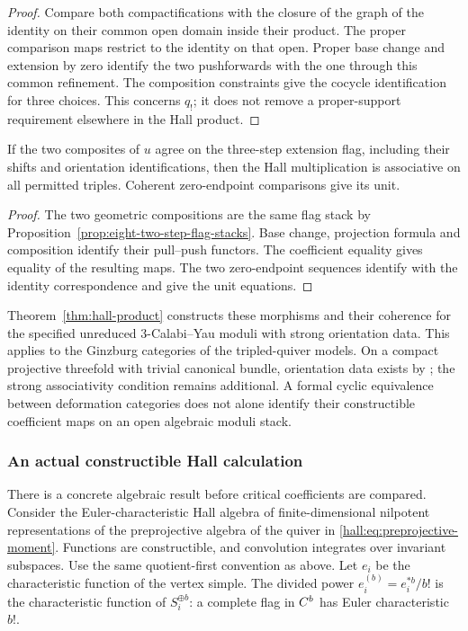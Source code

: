 \begin{proof}
Compare both compactifications with the closure of the graph of
the identity on their common open domain inside their product.
The proper comparison maps restrict to the identity on that
open. Proper base change and extension by zero identify the two
pushforwards with the one through this common refinement.
The composition constraints give the cocycle identification
for three choices. This concerns $q_!$; it does not remove a
proper-support requirement elsewhere in the Hall product.
\end{proof}

\begin{proposition}
\label{prop:finite-hall-product-associativity-two-step-flags}
If the two composites of $u$ agree on the three-step extension
flag, including their shifts and orientation identifications,
then the Hall multiplication is associative on all permitted
triples. Coherent zero-endpoint comparisons give its unit.
\end{proposition}

\begin{proof}
The two geometric compositions are the same flag stack by
Proposition~\ref{prop:eight-two-step-flag-stacks}. Base change,
projection formula and composition identify their pull--push
functors. The coefficient equality gives equality of the
resulting maps. The two zero-endpoint sequences identify with
the identity correspondence and give the unit equations.
\end{proof}

Theorem~\ref{thm:hall-product} constructs these morphisms and
their coherence for the specified unreduced $3$-Calabi--Yau
moduli with strong orientation data. This applies to the
Ginzburg categories of the tripled-quiver models. On a compact
projective threefold with trivial canonical bundle, orientation
data exists by
\cite[Theorem~4.4]{JoyceUpmeier}; the strong associativity
condition remains additional. A formal cyclic equivalence
between deformation categories does not alone identify their
constructible coefficient maps on an open algebraic moduli
stack.

\subsubsection*{An actual constructible Hall calculation}

There is a concrete algebraic result before critical
coefficients are compared. Consider the Euler-characteristic
Hall algebra of finite-dimensional nilpotent representations of
the preprojective algebra of the quiver in
\eqref{hall:eq:preprojective-moment}. Functions are constructible,
and convolution integrates over invariant subspaces.
Use the same quotient-first convention as above.
Let $e_i$ be the characteristic function of the vertex simple.
The divided power $e_i^{(b)}=e_i^{*b}/b!$ is the characteristic
function of $S_i^{\oplus b}$: a complete flag in $C^b$ has
Euler characteristic $b!$.

